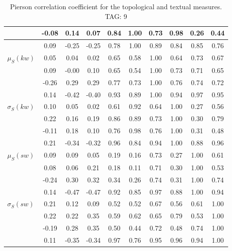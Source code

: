 \begin{table*}[h!]
\begin{center}
\begin{tabular}{| l | c | c | c | c | c | c | c | c | c |}
 & -0.08  & 0.14  & 0.07  & 0.84  & 1.00  & 0.73  & 0.98  & 0.26  & 0.44 \\\hline
 & 0.09  & -0.25  & -0.25  & 0.78  & 1.00  & 0.89  & 0.84  & 0.85  & 0.76 \\\hline
$\mu_S(kw)$ & 0.05  & 0.04  & 0.02  & 0.65  & 0.58  & 1.00  & 0.64  & 0.73  & 0.67 \\\hline
 & 0.09  & -0.00  & 0.10  & 0.65  & 0.54  & 1.00  & 0.73  & 0.71  & 0.65 \\\hline
 & -0.26  & 0.29  & 0.29  & 0.77  & 0.73  & 1.00  & 0.76  & 0.74  & 0.72 \\\hline
 & 0.14  & -0.42  & -0.40  & 0.93  & 0.89  & 1.00  & 0.94  & 0.97  & 0.95 \\\hline
$\sigma_S(kw)$ & 0.10  & 0.05  & 0.02  & 0.61  & 0.92  & 0.64  & 1.00  & 0.27  & 0.56 \\\hline
 & 0.22  & 0.16  & 0.19  & 0.86  & 0.89  & 0.73  & 1.00  & 0.30  & 0.79 \\\hline
 & -0.11  & 0.18  & 0.10  & 0.76  & 0.98  & 0.76  & 1.00  & 0.31  & 0.48 \\\hline
 & 0.21  & -0.34  & -0.32  & 0.96  & 0.84  & 0.94  & 1.00  & 0.88  & 0.96 \\\hline
$\mu_S(sw)$ & 0.09  & 0.09  & 0.05  & 0.19  & 0.16  & 0.73  & 0.27  & 1.00  & 0.61 \\\hline
 & 0.08  & 0.06  & 0.21  & 0.18  & 0.11  & 0.71  & 0.30  & 1.00  & 0.53 \\\hline
 & -0.24  & 0.30  & 0.32  & 0.34  & 0.26  & 0.74  & 0.31  & 1.00  & 0.74 \\\hline
 & 0.14  & -0.47  & -0.47  & 0.92  & 0.85  & 0.97  & 0.88  & 1.00  & 0.94 \\\hline
$\sigma_S(sw)$ & 0.21  & 0.12  & 0.09  & 0.52  & 0.52  & 0.67  & 0.56  & 0.61  & 1.00 \\\hline
 & 0.22  & 0.22  & 0.35  & 0.59  & 0.62  & 0.65  & 0.79  & 0.53  & 1.00 \\\hline
 & -0.19  & 0.28  & 0.35  & 0.50  & 0.44  & 0.72  & 0.48  & 0.74  & 1.00 \\\hline
 & 0.11  & -0.35  & -0.34  & 0.97  & 0.76  & 0.95  & 0.96  & 0.94  & 1.00 \\\hline
\end{tabular}
\caption{Pierson correlation coefficient for the topological and textual measures. TAG: 9}
\end{center}
\end{table*}